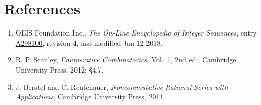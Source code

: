 \documentclass[11pt]{article}
\theoremstyle{definition}
\begin{document}
\section{References}

\begin{enumerate}

\item OEIS Foundation Inc., \emph{The On-Line Encyclopedia of Integer Sequences}, entry \href{https://oeis.org/A298100}{A298100}, revision 4, last modified Jan 12 2018.

\item R. P. Stanley, \emph{Enumerative Combinatorics}, Vol.~1, 2nd ed., Cambridge University Press, 2012; \S4.7.

\item J. Berstel and C. Reutenauer, \emph{Noncommutative Rational Series with Applications}, Cambridge University Press, 2011.

\end{enumerate}
\end{document}
